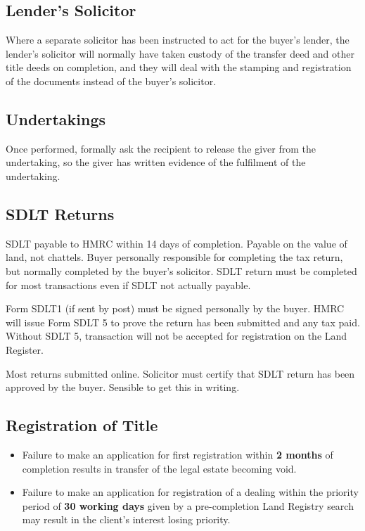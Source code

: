 \documentclass[
]{article}
\providecommand{\tightlist}{%
  \setlength{\itemsep}{0pt}\setlength{\parskip}{0pt}}
\begin{document}
\hypertarget{lenders-solicitor}{%
\subsection{Lender's Solicitor}\label{lenders-solicitor}}

Where a separate solicitor has been instructed to act for the buyer's
lender, the lender's solicitor will normally have taken custody of the
transfer deed and other title deeds on completion, and they will deal
with the stamping and registration of the documents instead of the
buyer's solicitor.

\hypertarget{undertakings}{%
\subsection{Undertakings}\label{undertakings}}

Once performed, formally ask the recipient to release the giver from the
undertaking, so the giver has written evidence of the fulfilment of the
undertaking.

\hypertarget{sdlt-returns}{%
\subsection{SDLT Returns}\label{sdlt-returns}}

SDLT payable to HMRC within 14 days of completion. Payable on the value
of land, not chattels. Buyer personally responsible for completing the
tax return, but normally completed by the buyer's solicitor. SDLT return
must be completed for most transactions even if SDLT not actually
payable.

Form SDLT1 (if sent by post) must be signed personally by the buyer.
HMRC will issue Form SDLT 5 to prove the return has been submitted and
any tax paid. Without SDLT 5, transaction will not be accepted for
registration on the Land Register.

Most returns submitted online. Solicitor must certify that SDLT return
has been approved by the buyer. Sensible to get this in writing.

\hypertarget{registration-of-title}{%
\subsection{Registration of Title}\label{registration-of-title}}

\begin{itemize}
\tightlist
\item
  Failure to make an application for first registration within \textbf{2
  months} of completion results in transfer of the legal estate becoming
  void.
\item
  Failure to make an application for registration of a dealing within
  the priority period of \textbf{30 working days} given by a
  pre-completion Land Registry search may result in the client's
  interest losing priority.
\end{itemize}
\end{document}
